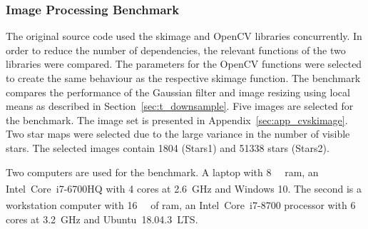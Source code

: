 \begin{table}[htb]
    \centering
    \caption{Summary of two profiles obtained while executing a complete run of \gls{sispo}, i.e. rendering, compression and reconstruction. More than \SI{90}{\percent} of total time is spent rendering images.}
    \label{tab:profiles}
\end{table}

\subsubsection{Image Processing Benchmark} \label{sec:cvskimage}
The original source code used the \gls{skimage} and OpenCV libraries concurrently. In order to reduce the number of dependencies, the relevant functions of the two libraries were compared. The parameters for the OpenCV functions were selected to create the same behaviour as the respective \gls{skimage} function. The benchmark compares the performance of the Gaussian filter and image resizing using local means as described in Section~\ref{sec:t_downsample}. Five images are selected for the benchmark. The image set is presented in Appendix~\ref{sec:app_cvskimage}. Two star maps were selected due to the large variance in the number of visible stars. The selected images contain 1804 (Stars1) and 51338 stars (Stars2).

Two computers are used for the benchmark. A laptop with \SI{8}{\giga\byte} \gls{ram}, an Intel\textsuperscript{\textregistered}~Core\texttrademark~i7-6700HQ with \SI{4}{} cores at \SI{2.6}{\giga\hertz} and Windows 10. The second is a workstation computer with \SI{16}{\giga\byte} of \gls{ram}, an Intel\textsuperscript{\textregistered}~Core\texttrademark~i7-8700 processor with \SI{6}{} cores at \SI{3.2}{\giga\hertz} and Ubuntu~18.04.3~LTS.

